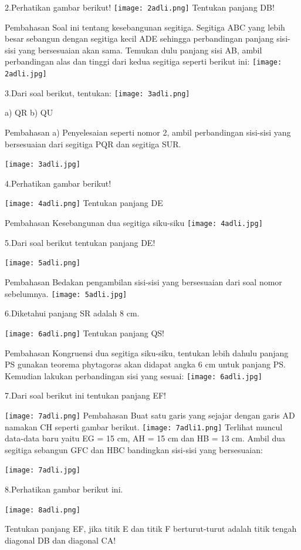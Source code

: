 \documentclass[11pt,fleqn]{book} %
\begin{document}
2.Perhatikan gambar berikut! 
 \texttt{[image: 2adli.png]}
Tentukan panjang DB!

Pembahasan
Soal ini tentang kesebangunan segitiga. Segitiga ABC yang lebih besar sebangun dengan segitiga kecil ADE sehingga perbandingan panjang sisi-sisi yang bersesuaian akan sama. Temukan dulu panjang sisi AB, ambil perbandingan alas dan tinggi dari kedua segitiga seperti berikut ini:
\texttt{[image: 2adli.jpg]}

3.Dari soal berikut, tentukan:
 \texttt{[image: 3adli.png]}
 
a) QR
b) QU

Pembahasan
a) Penyelesaian seperti nomor 2, ambil perbandingan sisi-sisi yang bersesuaian dari segitiga PQR dan segitiga SUR. 

\texttt{[image: 3adli.jpg]}

4.Perhatikan gambar berikut! 
 
\texttt{[image: 4adli.png]}
Tentukan panjang DE

Pembahasan
Kesebangunan dua segitiga siku-siku 
\texttt{[image: 4adli.jpg]}

5.Dari soal berikut tentukan panjang DE! 
 
\texttt{[image: 5adli.png]}

Pembahasan
Bedakan pengambilan sisi-sisi yang bersesuaian dari soal nomor sebelumnya. 
\texttt{[image: 5adli.jpg]}

6.Diketahui panjang SR adalah 8 cm. 

\texttt{[image: 6adli.png]}
Tentukan panjang QS!

Pembahasan
Kongruensi dua segitiga siku-siku, tentukan lebih dahulu panjang PS gunakan teorema phytagoras akan didapat angka 6 cm untuk panjang PS. Kemudian lakukan perbandingan sisi yang sesuai: 
\texttt{[image: 6adli.jpg]}

7.Dari soal berikut ini tentukan panjang EF! 
 
\texttt{[image: 7adli.png]}
Pembahasan
Buat satu garis yang sejajar dengan garis AD namakan CH seperti gambar berikut. 
\texttt{[image: 7adli1.png]}
Terlihat muncul  data-data baru yaitu EG = 15 cm, AH = 15 cm dan HB = 13 cm. Ambil dua segitiga sebangun GFC dan HBC bandingkan sisi-sisi yang bersesuaian:

\texttt{[image: 7adli.jpg]}

8.Perhatikan gambar berikut ini. 

\texttt{[image: 8adli.png]}

Tentukan panjang EF, jika titik E dan titik F berturut-turut adalah titik tengah diagonal DB dan diagonal CA!
\end{document}
